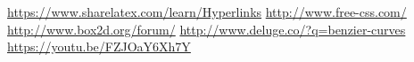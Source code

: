 \begin{thebibliography}{99}
 \url{https://www.sharelatex.com/learn/Hyperlinks}
 \url{http://www.free-css.com/}
 \url{http://www.box2d.org/forum/}
 \url{http://www.deluge.co/?q=benzier-curves}
 \url{https://youtu.be/FZJOaY6Xh7Y}
\end{thebibliography}